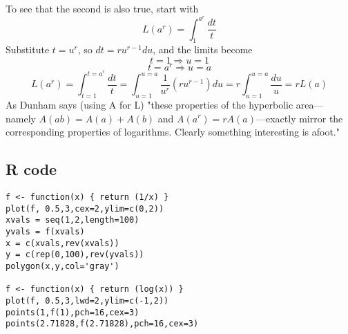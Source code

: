 \documentclass[11pt, oneside]{article}   	%
\begin{document}
To see that the second is also true, start with
\[ L(a^r) = \int_1^{a^r} \frac{dt}{t}   \]
Substitute $t=u^r$, so $dt = ru^{r-1} du$, and the limits become 
\[ t=1 \Rightarrow u=1  \]
\[ t=a^r \Rightarrow u=a  \]
\[ L(a^r) = \int_{t=1}^{t=a^r} \frac{dt}{t} = \int_{u=1}^{u=a} \frac{1}{u^r} (ru^{r-1}) du = r \int_{u=1}^{u=a}  \frac{du}{u} = rL(a) \]
As Dunham says (using A for L) "these properties of the hyperbolic area---namely $A(ab) = A(a) + A(b)$ and $A(a^r) = rA(a)$---exactly mirror the corresponding properties of logarithms.  Clearly something interesting is afoot."

\subsection*{R code}

\begin{lstlisting}
f <- function(x) { return (1/x) }
plot(f, 0.5,3,cex=2,ylim=c(0,2))
xvals = seq(1,2,length=100)
yvals = f(xvals)
x = c(xvals,rev(xvals))
y = c(rep(0,100),rev(yvals))
polygon(x,y,col='gray')

f <- function(x) { return (log(x)) }
plot(f, 0.5,3,lwd=2,ylim=c(-1,2))
points(1,f(1),pch=16,cex=3)
points(2.71828,f(2.71828),pch=16,cex=3)
\end{lstlisting}
\end{document}
